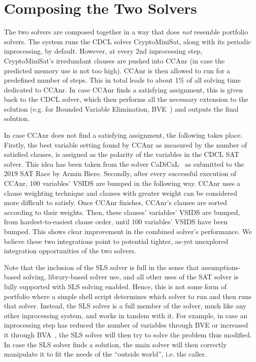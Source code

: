 \documentclass[final]{ieee}
\begin{document}
\section{Composing the Two Solvers}
The two solvers are composed together in a way that does \emph{not} resemble portfolio solvers. The system runs the CDCL solver CryptoMiniSat, along with its periodic inprocessing, by default. However, at every 2nd inprocessing step, CryptoMiniSat's irredundant clauses are pushed into CCAnr (in case the predicted memory use is not too high). CCAnr is then allowed to run for a predefined number of steps. This in total leads to about 1\% of all solving time dedicated to CCAnr. In case CCAnr finds a satisfying assignment, this is given back to the CDCL solver, which then performs all the necessary extension to the solution (e.g. for Bounded Variable Elimination, BVE~\cite{BVE}) and outputs the final solution.

In case CCAnr does not find a satisfying assignment, the following takes place. Firstly, the best variable setting found by CCAnr as measured by the number of satisfied clauses, is assigned as the polarity of the variables in the CDCL SAT solver. This idea has been taken from the solver CaDiCaL~\cite{cadical} as submitted to the 2019 SAT Race by Armin Biere.
%
Secondly, after every successful execution of CCAnr, 100 variables' VSIDS are bumped in the following way. CCAnr uses a clause weighting technique and clauses with greater weight can be considered more difficult to satisfy. Once CCAnr finishes, CCAnr's clauses are sorted according to their weights. Then, these clauses' variables' VSIDS are bumped, from hardest-to-easiest clause order, until 100 variables' VSIDS have been bumped.
% 
This shows clear improvement in the combined solver's performance. We believe these two integrations point to potential tighter, as-yet unexplored integration opportunities of the two solvers.

Note that the inclusion of the SLS solver is full in the sense that assumptions-based solving, library-based solver use, and all other uses of the SAT solver is fully supported with SLS solving enabled. Hence, this is not some form of portfolio where a simple shell script determines which solver to run and then runs that solver. Instead, the SLS solver is a full member of the solver, much like any other inprocessing system, and works in tandem with it. For example, in case an inprocessing step has reduced the number of variables through BVE or increased it through BVA~\cite{BVA}, the SLS solver will then try to solve the problem thus modified. In case the SLS solver finds a solution, the main solver will then correctly manipulate it to fit the needs of the ``outside world'', i.e. the caller.
\end{document}
